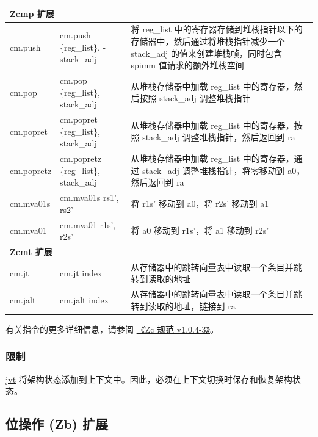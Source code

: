 \documentclass[main\_\_CN.tex]{subfiles}
\begin{document}
\begin{longtable}{ | p{2.0cm} | p{4.0cm} |  p{10.0cm} | }
\multicolumn{3}{|l|}{\textbf{Zcmp 扩展}} \\\hline

cm.push & cm.push \{reg\_list\}, -stack\_adj & 将 reg\_list 中的寄存器存储到堆栈指针以下的存储器中，然后通过将堆栈指针减少一个 stack\_adj 的值来创建堆栈帧，同时包含 spimm 值请求的额外堆栈空间\\\hline
cm.pop & cm.pop \{reg\_list\}, stack\_adj & 从堆栈存储器中加载 reg\_list 中的寄存器，然后按照 stack\_adj 调整堆栈指针 \\\hline
cm.popret & cm.popret \{reg\_list\}, stack\_adj & 从堆栈存储器中加载 reg\_list 中的寄存器，按照 stack\_adj 调整堆栈指针，然后返回到 ra\\\hline
cm.popretz & cm.popretz \{reg\_list\}, stack\_adj & 从堆栈存储器中加载 reg\_list 中的寄存器，通过 stack\_adj 调整堆栈指针，将零移动到 a0，然后返回到 ra\\\hline
cm.mva01s & cm.mva01s rs1', rs2' &  将 r1s' 移动到 a0，将 r2s' 移动到 a1\\\hline
cm.mva01 & cm.mva01 r1s', r2s' & 将 a0 移动到 r1s'，将 a1 移动到 r2s' \\\hline

\multicolumn{3}{|l|}{\textbf{Zcmt 扩展}} \\\hline

cm.jt & cm.jt index & 从存储器中的跳转向量表中读取一个条目并跳转到读取的地址 \\\hline
cm.jalt & cm.jalt index & 从存储器中的跳转向量表中读取一个条目并跳转到读取的地址，链接到 ra  \\\hline

\end{longtable}

有关指令的更多详细信息，请参阅 \href{https://github.com/riscvarchive/riscv-code-size-reduction/blob/v1.0.4-3/Zc-specification/Zc.adoc}{《Zc 规范 v1.0.4-3》}。

\subsubsection{限制}
\label{sec:riscvcpu-zc-limit-descr}

\hyperref[regdesc:JVT]{jvt} 将架构状态添加到上下文中。因此，必须在上下文切换时保存和恢复架构状态。



\newpage
\subsection{位操作 (Zb) 扩展}
\label{sec:riscvcpu-zb}
\end{document}

